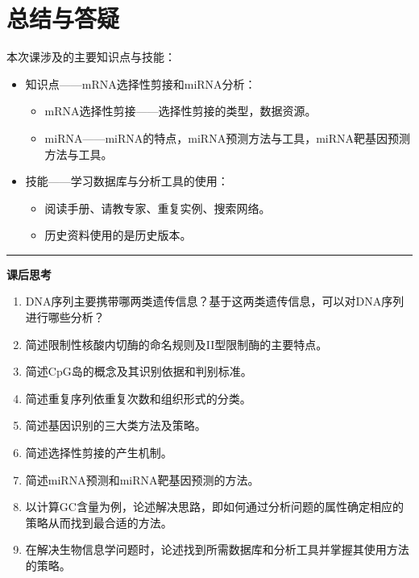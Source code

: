 \documentclass[11pt,a4paper,twoside]{book}
\begin{document}
\section{总结与答疑}
本次课涉及的主要知识点与技能：
\begin{itemize}
  \item 知识点——mRNA选择性剪接和miRNA分析：
    \begin{itemize}
      \item mRNA选择性剪接——选择性剪接的类型，数据资源。
      \item miRNA——miRNA的特点，miRNA预测方法与工具，miRNA靶基因预测方法与工具。
    \end{itemize}
  \item 技能——学习数据库与分析工具的使用：
    \begin{itemize}
      \item 阅读手册、请教专家、重复实例、搜索网络。
      \item 历史资料使用的是历史版本。
    \end{itemize}
\end{itemize}


\vspace{1cm}
\hrule height 3pt

\noindent
{\Large \bfseries \Coffeecup 课后思考}
\begin{enumerate}
  \item DNA序列主要携带哪两类遗传信息？基于这两类遗传信息，可以对DNA序列进行哪些分析？
  \item 简述限制性核酸内切酶的命名规则及II型限制酶的主要特点。
  \item 简述CpG岛的概念及其识别依据和判别标准。
  \item 简述重复序列依重复次数和组织形式的分类。
  \item 简述基因识别的三大类方法及策略。
  \item 简述选择性剪接的产生机制。
  \item 简述miRNA预测和miRNA靶基因预测的方法。
  \item 以计算GC含量为例，论述解决思路，即如何通过分析问题的属性确定相应的策略从而找到最合适的方法。
  \item 在解决生物信息学问题时，论述找到所需数据库和分析工具并掌握其使用方法的策略。
\end{enumerate}
\end{document}
